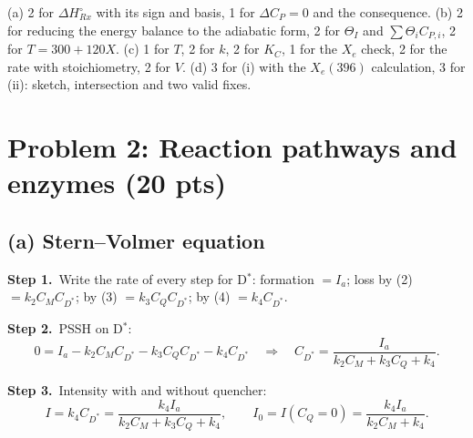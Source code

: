 \documentclass[11pt]{article}
\newcommand{\step}[1]{\par\smallskip\textbf{Step #1.}\ }
\begin{document}
\begin{center}
\end{center}

\begin{grading}
(a) 2 for $\Delta H^\circ_{Rx}$ with its sign and basis, 1 for $\Delta C_P=0$ and the consequence.
(b) 2 for reducing the energy balance to the adiabatic form, 2 for $\Theta_I$ and $\sum\Theta_iC_{P,i}$, 2 for $T=300+120X$.
(c) 1 for $T$, 2 for $k$, 2 for $K_C$, 1 for the $X_e$ check, 2 for the rate with stoichiometry, 2 for $V$.
(d) 3 for (i) with the $X_e(396)$ calculation, 3 for (ii): sketch, intersection and two valid fixes.
\end{grading}

\section*{Problem 2: Reaction pathways and enzymes (20 pts)}

\subsection*{(a) Stern--Volmer equation}
\step{1}Write the rate of every step for D$^*$:
formation $=I_a$;\; loss by (2) $=k_2C_MC_{D^*}$;\; by (3) $=k_3C_QC_{D^*}$;\; by (4) $=k_4C_{D^*}$.

\step{2}PSSH on D$^*$:
\[
0=I_a-k_2C_MC_{D^*}-k_3C_QC_{D^*}-k_4C_{D^*}
\quad\Rightarrow\quad
C_{D^*}=\frac{I_a}{k_2C_M+k_3C_Q+k_4}.
\]
\step{3}Intensity with and without quencher:
\[
I=k_4C_{D^*}=\frac{k_4I_a}{k_2C_M+k_3C_Q+k_4},\qquad I_0=I(C_Q=0)=\frac{k_4I_a}{k_2C_M+k_4}.
\]
\end{document}
